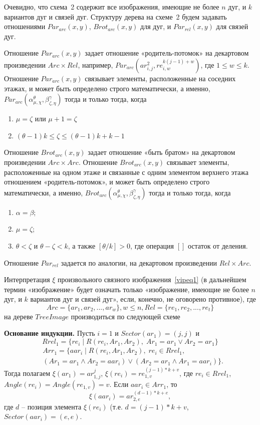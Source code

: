 Очевидно, что схема~2 содержит все изображения, имеющие не более $n$ дуг, и $k$ 
вариантов дуг и связей дуг. 
Структуру дерева на схеме~2 будем задавать отношениями 
$Par_{arc}(x,y)$, $Brot_{arc}(x,y)$ для дуг, и $Par_{rel}(x,y)$ для связей дуг.

Отношение $Par_{arc}(x,y)$ задает отношение «родитель-потомок» на 
декартовом произведении $Arc \times Rel$,
например, $Par_{arc}(ar_{i,j}^2, re_{i,w}^{k(j-1)+w})$, где $1 \le w 
\le k$. Отношение $Par_{arc}(x,y)$ связывает элементы, расположенные на 
соседних этажах, и может быть определено строго математически, а именно, 
$Par_{arc}(\alpha_{\mu,\chi}^\theta, \beta_{\zeta,\eta}^\gamma)$ тогда и только 
тогда, когда 
\begin{enumerate}
\item $\mu=\zeta$ или $\mu + 1 =\zeta$
\item $(\theta - 1)k \leq \zeta \leq (\theta - 1)k + k-1$
\end{enumerate}
Отношение $Brot_{arc}(x,y)$ задает отношение «быть братом» на 
декартовом произведении $Arc \times Arc$.
Отношение  $Brot_{arc}(x,y)$  связывает элементы, расположенные на одном этаже 
и связанные с одним элементом верхнего этажа отношением «ро\-ди\-тель-потомок», 
и может быть определено строго математически, а именно, 
$Brot_{arc}(\alpha_{\mu,\chi}^\theta, \beta_{\zeta,\eta}^\gamma)$ тогда и 
только тогда, когда
\begin{enumerate}
\item $\alpha=\beta$;
\item $\mu=\zeta$;
\item $\theta < \zeta$ и $\theta-\zeta<k$, а также $[\theta / k ]>0$, где 
операция $[ ]$ остаток от деления.
\end{enumerate}
Отношение $Par_{rel}$ задается по аналогии, на декартовом 
произведении $Rel \times Arc$.

Интерпретация $\xi$ произвольного связного изображения~\ref{vipeq1} (в дальнейшем термин «изображение» будет означать только «изображение, имеющие не более $n$ дуг, и $k$ вариантов дуг и связей дуг», если, конечно, не оговорено противное), где
\begin{equation}
Arc = \{ar_1, ar_2, ..., ar_w\}, w\le n, Rel=\{re_1, re_2, ..., re_t\}
\label{vipeq5}
\end{equation}
на дереве $TreeImage$ производиться по следующей схеме

\textbf{Основание индукции.} Пусть $i = 1$ и $Sector(ar_1) = (j, j)$ и 
$$Rrel_1 = \{ re_i\;|\;R(re_i, Ar_1 , Ar_2),\;Ar_1 = ar_1 \vee Ar_2 = ar_1 \}$$
\begin{eqnarray*}
&Arr_1 = \{ aar_i\;|\;R (re_i, Ar_1 , Ar_2),\;re_i \in Rrel_1,\nonumber \\ 
&(Ar_1 = ar_1 \wedge Ar_2 = aar_i) \vee (Ar_2 = ar_1 \wedge Ar_1 = aar_i) \}.
\end{eqnarray*}
Тогда полагаем $\xi(ar_1) = ar_{1,j}^j$, $\xi(re_i) = re_{1,v}^{(j-1)*k+v}$, где $re_i \in Rrel_1$, $Angle(re_i) = Angle(re_{1,v}) = v$. 
Если $aar_i \in Arr_1$, то $$\xi(aar_i)=ar_{2,e}^{(d-1)*k+e},$$ где $d$ – позиция элемента $\xi(re_i)$ (т.е. $d =(j-1)*k+v$, $Sector(aar_i) = (e, e)$.

